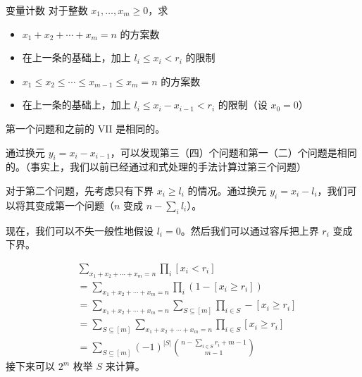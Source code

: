 \begin{frame}{变量计数}
    对于整数 $x_1,\ldots,x_m\ge 0$，求

    \begin{itemize}
        \item $x_1+x_2+\cdots+x_m=n$ 的方案数
        \item 在上一条的基础上，加上 $l_i\le x_i< r_i$ 的限制
        \item $x_1\le x_2\le\cdots\le x_{m-1}\le x_m=n$ 的方案数
        \item 在上一条的基础上，加上 $l_i\le x_i-x_{i-1}< r_i$ 的限制（设 $x_0=0$）
    \end{itemize}
\end{frame}
\begin{frame}
    第一个问题和之前的 VII 是相同的。

    通过换元 $y_i=x_i-x_{i-1}$，可以发现第三（四）个问题和第一（二）个问题是相同的。（事实上，我们以前已经通过和式处理的手法计算过第三个问题）

    对于第二个问题，先考虑只有下界 $x_i\ge l_i$ 的情况。通过换元 $y_i=x_i-l_i$，我们可以将其变成第一个问题（$n$ 变成 $n-\sum_i l_i$）。

    现在，我们可以不失一般性地假设 $l_i=0$。然后我们可以通过容斥把上界 $r_i$ 变成下界。
\end{frame}
\begin{frame}
    $$
    \begin{aligned}
    &\sum_{x_1+x_2+\cdots+x_m=n}\prod_i [x_i<r_i]\\
    &=\sum_{x_1+x_2+\cdots+x_m=n}\prod_i(1-[x_i\ge r_i])\\
    &=\sum_{x_1+x_2+\cdots+x_m=n}\sum_{S\subseteq [m]}\prod_{i\in S}-[x_i\ge r_i]\\
    &=\sum_{S\subseteq [m]}\sum_{x_1+x_2+\cdots+x_m=n}\prod_{i\in S}[x_i\ge r_i]\\
    &=\sum_{S\subseteq [m]}(-1)^{|S|}\binom{n-\sum_{i\in S}r_i+m-1}{m-1}
    \end{aligned}
    $$
    接下来可以 $2^m$ 枚举 $S$ 来计算。
\end{frame}

